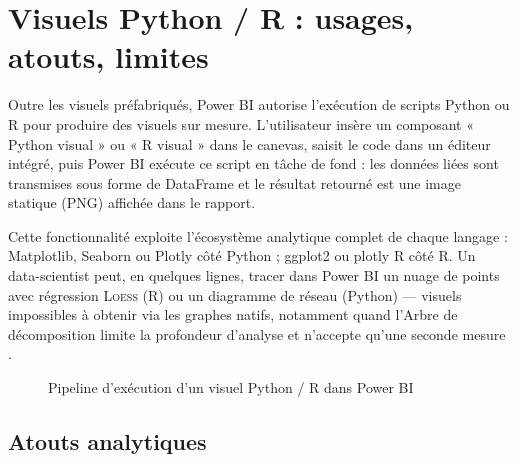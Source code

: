 \section{Visuels Python / R : usages, atouts, limites}
\label{sec:python-r-visuals}

Outre les visuels préfabriqués, Power BI autorise l’exécution de scripts Python ou R pour produire des visuels sur mesure.  
L’utilisateur insère un composant « Python visual » ou « R visual » dans le canevas, saisit le code dans un éditeur intégré, puis Power BI exécute ce script en tâche de fond : les données liées sont transmises sous forme de DataFrame et le résultat retourné est une image statique (PNG) affichée dans le rapport.

Cette fonctionnalité exploite l’écosystème analytique complet de chaque langage : Matplotlib, Seaborn ou Plotly côté Python ; ggplot2 ou plotly R côté R.  
Un data-scientist peut, en quelques lignes, tracer dans Power BI un nuage de points avec régression \textsc{Loess} (R) ou un diagramme de réseau (Python) — visuels impossibles à obtenir via les graphes natifs, notamment quand l’Arbre de décomposition limite la profondeur d’analyse et n’accepte qu’une seconde mesure \parencite{MicrosoftDecompositionTree2024}.

\begin{figure}[h]
  \centering
  \caption{Pipeline d’exécution d’un visuel Python / R dans Power BI}
  \label{fig:python-r-pipeline}
\end{figure}

\subsection{Atouts analytiques}

